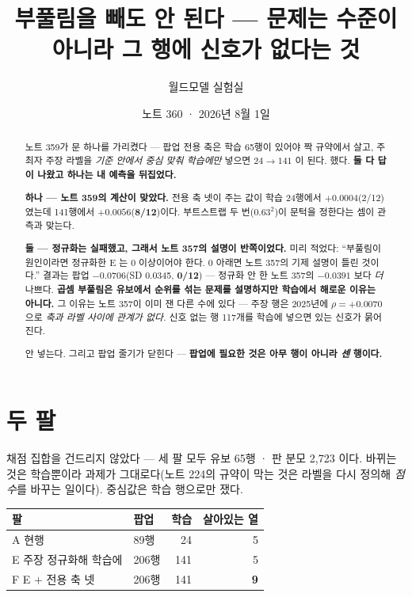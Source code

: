 \documentclass[11pt]{article}
\begin{document}
\title{부풀림을 빼도 안 된다 --- 문제는 수준이 아니라 그 행에 신호가 없다는 것}
\author{월드모델 실험실}
\date{노트 360 · 2026년 8월 1일}
\maketitle

\begin{abstract}
노트 359가 문 하나를 가리켰다 --- 팝업 전용 축은 학습 65행이 있어야
짝 규약에서 살고, 주최자 주장 라벨을 \emph{기준 안에서 중심 맞춰 학습에만}
넣으면 $24 \to 141$ 이 된다. 했다. \textbf{둘 다 답이 나왔고 하나는
내 예측을 뒤집었다.}

\textbf{하나 --- 노트 359의 계산이 맞았다.} 전용 축 넷이 주는 값이 학습
24행에서 $+0.0004$(2/12)였는데 141행에서 $+0.0056$(\textbf{8/12})이다.
부트스트랩 두 번($0.63^2$)이 문턱을 정한다는 셈이 관측과 맞는다.

\textbf{둘 --- 정규화는 실패했고, 그래서 노트 357의 설명이 반쪽이었다.}
미리 적었다: ``부풀림이 원인이라면 정규화한 E 는 0 이상이어야 한다.
0 아래면 노트 357의 기제 설명이 틀린 것이다.'' 결과는 팝업
$\mathbf{-0.0706}$(SD 0.0345, \textbf{0/12}) --- 정규화 안 한 노트 357의
$-0.0391$ 보다 \emph{더} 나쁘다. \textbf{곱셈 부풀림은 유보에서 순위를
섞는 문제를 설명하지만 학습에서 해로운 이유는 아니다.} 그 이유는 노트
357이 이미 잰 다른 수에 있다 --- 주장 행은 2025년에 $\rho = +0.0070$ 으로
\emph{축과 라벨 사이에 관계가 없다.} 신호 없는 행 117개를 학습에 넣으면
있는 신호가 묽어진다.

안 넣는다. 그리고 팝업 줄기가 닫힌다 --- \textbf{팝업에 필요한 것은 아무
행이 아니라 \emph{센} 행이다.}
\end{abstract}

\section{두 팔}

채점 집합을 건드리지 않았다 --- 세 팔 모두 유보 65행 · 판 분모 2,723 이다.
바뀌는 것은 학습뿐이라 과제가 그대로다(노트 224의 규약이 막는 것은 라벨을
다시 정의해 \emph{점수}를 바꾸는 일이다). 중심값은 학습 행으로만 쟀다.

\begin{center}
\begin{tabular}{llrr}
\hline
팔 & 팝업 & 학습 & 살아있는 열 \\
\hline
A 현행                     & 89행  & 24  & 5 \\
E 주장 정규화해 학습에      & 206행 & 141 & 5 \\
F E $+$ 전용 축 넷         & 206행 & 141 & \textbf{9} \\
\hline
\end{tabular}
\end{center}
\end{document}
